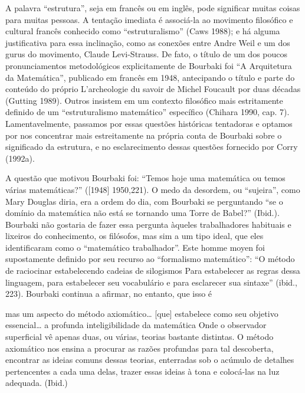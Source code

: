 \documentclass[12pt]{article}
\begin{document}
A palavra “estrutura”, seja em francês ou em inglês, pode significar muitas coisas para muitas pessoas. A tentação imediata é associá-la ao movimento filosófico e cultural francês conhecido como “estruturalismo” (Caws 1988); e há alguma justificativa para essa inclinação, como as conexões entre Andre Weil e um dos gurus do movimento, Claude Levi-Strauss. De fato, o título de um dos poucos pronunciamentos metodológicos explicitamente de Bourbaki foi “A Arquitetura da Matemática”, publicado em francês em 1948, antecipando o título e parte do conteúdo do próprio L’archeologie du savoir de Michel Foucault por duas décadas (Gutting 1989). Outros insistem em um contexto filosófico mais estritamente definido de um “estruturalismo matemático” específico (Chihara 1990, cap. 7). Lamentavelmente, passamos por essas questões históricas tentadoras e optamos por nos concentrar mais estreitamente na própria conta de Bourbaki sobre o significado da estrutura, e no esclarecimento dessas questões fornecido por Corry (1992a).

A questão que motivou Bourbaki foi: “Temos hoje uma matemática ou temos várias matemáticas?” ([1948] 1950,221). O medo da desordem, ou “sujeira”, como Mary Douglas diria, era a ordem do dia, com Bourbaki se perguntando “se o domínio da matemática não está se tornando uma Torre de Babel?” (Ibid.). Bourbaki não gostaria de fazer essa pergunta àqueles trabalhadores habituais e lixeiros do conhecimento, os filósofos, mas sim a um tipo ideal, que eles identificaram como o “matemático trabalhador”. Este homme moyen foi supostamente definido por seu recurso ao “formalismo matemático”: “O método de raciocinar estabelecendo cadeias de silogismos Para estabelecer as regras dessa linguagem, para estabelecer seu vocabulário e para esclarecer sua sintaxe” (ibid., 223). Bourbaki continua a afirmar, no entanto, que isso é

mas um aspecto do método axiomático… [que] estabelece como seu objetivo essencial… a profunda inteligibilidade da matemática Onde o observador superficial vê apenas duas, ou várias, teorias bastante distintas. O método axiomático nos ensina a procurar as razões profundas para tal descoberta, encontrar as ideias comuns dessas teorias, enterradas sob o acúmulo de detalhes pertencentes a cada uma delas, trazer essas ideias à tona e colocá-las na luz adequada. (Ibid.)
\end{document}
